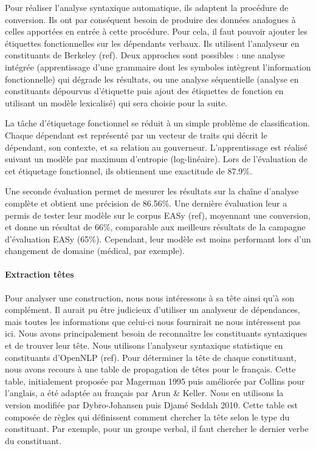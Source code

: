 \documentclass[a4paper,12pt]{article}
\begin{document}
Pour réaliser l'analyse syntaxique automatique, ils adaptent la procédure de conversion. Ils ont par conséquent besoin de produire des données analogues à celles apportées en entrée à cette procédure. Pour cela, il faut pouvoir ajouter les étiquettes fonctionnelles sur les dépendants verbaux. Ils utilisent l'analyseur en constituants de Berkeley (ref). Deux approches sont possibles : une analyse intégrée (apprentissage d'une grammaire dont les symboles intègrent l'information fonctionnelle) qui dégrade les résultats, ou une analyse séquentielle (analyse en constituants dépourvus d'étiquette puis ajout des étiquettes de fonction en utilisant un modèle lexicalisé) qui sera choisie pour la suite.

La tâche d'étiquetage fonctionnel se réduit à un simple problème de classification. Chaque dépendant est représenté par un vecteur de traits qui décrit le dépendant, son contexte, et sa relation au gouverneur. L'apprentissage est réalisé suivant un modèle par maximum d'entropie (log-linéaire). Lors de l'évaluation de cet étiquetage fonctionnel, ils obtiennent une exactitude de 87.9\%.

Une seconde évaluation permet de mesurer les résultats sur la chaîne d'analyse complète et obtient une précision de 86.56\%. Une dernière évaluation leur a permis de tester leur modèle sur le corpus EASy (ref), moyennant une conversion, et donne un résultat de 66\%, comparable aux meilleurs résultats de la campagne d'évaluation EASy (65\%). Cependant, leur modèle est moins performant lors d'un changement de domaine (médical, par exemple).

\paragraph{Extraction têtes}
Pour analyser une construction, nous nous intéressons à sa tête ainsi qu'à son complément. Il aurait pu être judicieux d'utiliser un analyseur de dépendances, mais toutes les informations que celui-ci nous fournirait ne nous intéressent pas ici. Nous avons principalement besoin de reconnaître les constituants syntaxiques et de trouver leur tête. Nous utilisons l'analyseur syntaxique statistique en constituants d'OpenNLP (ref). Pour déterminer la tête de chaque constituant, nous avons recours à une table de propagation de têtes pour le français. Cette table, initialement proposée par Magerman 1995 puis améliorée par Collins pour l'anglais, a été adaptée au français par Arun & Keller. Nous en utilisons la version modifiée par Dybro-Johansen puis Djamé Seddah 2010. Cette table est composée de règles qui définissent comment chercher la tête selon le type du constituant. Par exemple, pour un groupe verbal, il faut chercher le dernier verbe du constituant.
\end{document}
